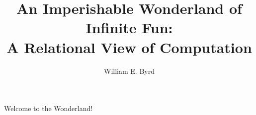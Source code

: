 \documentclass{book}
\title{An Imperishable Wonderland of Infinite Fun: \\ A Relational View of Computation}
\author{William E. Byrd}
\begin{document}
\maketitle

Welcome to the Wonderland!
\end{document}
